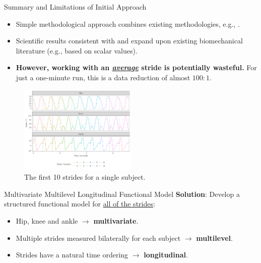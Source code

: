 \documentclass[aspectratio=128,xcolor=dvipsnames, notes]{beamer}
\newcommand{\1}{\mathbf{1}}
\begin{document}
\begin{frame}{Summary and Limitations of Initial Approach}
    \begin{itemize}
        \pause \item Simple methodological approach combines existing methodologies, e.g., \textcite{morris_wavelet-based_2006, di_multilevel_2009, crainiceanu_bootstrap-based_2012}.
        \pause \item Scientific results consistent with and expand upon existing biomechanical literature (e.g., based on scalar values).
        \pause \item \textbf{However, working with an \underline{\textit{average}} stride is potentially wasteful.} For just a one-minute run, this is a data reduction of almost $100:1$.
    \end{itemize}
    \begin{figure}
        \centering
        \includegraphics[page = 1, width = 0.5\textwidth]{figures/RISC1-longitudinal-manuscript-code.pdf}
        \caption{The first 10 strides for a single subject.}
        \label{fig:enter-label}
    \end{figure}
\end{frame}

\begin{frame}{Multivariate Multilevel Longitudinal Functional Model \parencite{gunning_multivariate_2023}}
\large
\textbf{Solution}: Develop a structured functional model for \underline{all of the strides}:
\begin{itemize}
    \pause \item Hip, knee and ankle $\rightarrow$ \textbf{multivariate}.
    \pause \item Multiple strides measured bilaterally for each subject $\rightarrow$ \textbf{multilevel}.
    \pause \item Strides have a natural time ordering $\rightarrow$ \textbf{longitudinal}.
\end{itemize}
\end{frame}
\end{document}
